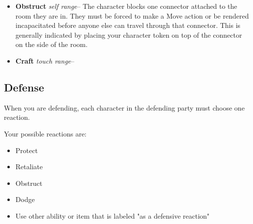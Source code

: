 \begin{GRPquicknotewide}
\begin{itemize}
\begin{itemize}
			If you win the contest, you may force the target to make a single move action of your choice.

			Additional forced movement requires additional grapple actions.

			\item \textbf{Disable} \emph{Touch range}-- Impair another character from accessing their augments for the rest of phased mode. This could involve attacking a pressure point or critical point meant to prevent the flow of energy to a character's augments.

			The initiating character rolls  and the target contests with . 

			If you win the contest, the target's  is temporarily reduced by 1 and they must choose augments to temporarily disable until they are below their new . Their  is restored to normal as soon as Phased mode ends.
		\end{itemize}
	\item \textbf{Obstruct} \emph{self range}-- The character blocks one connector attached to the room they are in. They must be forced to make a Move action or be rendered incapacitated before anyone else can travel through that connector. This is generally indicated by placing your character token on top of the connector on the side of the room.
	\item \textbf{Craft} \emph{touch range}-- 
\end{itemize}
\end{GRPquicknotewide}

\subsection{Defense}

When you are defending, each character in the defending party must choose one reaction.

Your possible reactions are:

\begin{itemize}
	\item Protect
	\item Retaliate
	\item Obstruct
	\item Dodge
	\item Use other ability or item that is labeled "as a defensive reaction"
\end{itemize}

